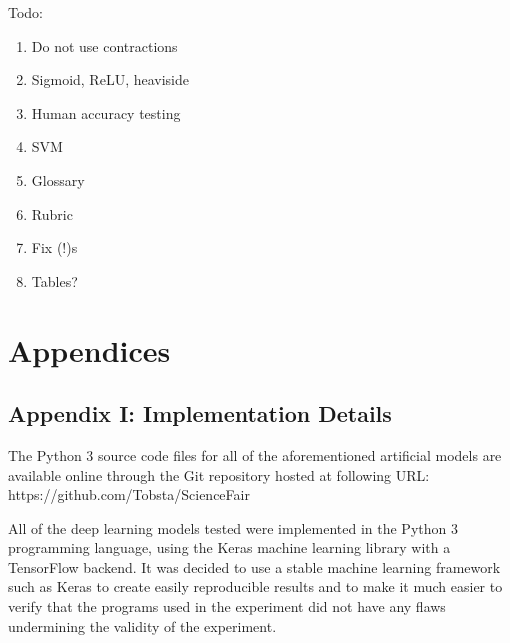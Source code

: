 \documentclass[]{report}
\begin{document}
Todo:

\begin{enumerate}
	\item Do not use contractions
	\item Sigmoid, ReLU, heaviside
	\item Human accuracy testing
	\item SVM
	\item Glossary
	\item Rubric
	\item Fix (!)s
	\item Tables?
\end{enumerate}

\section{Appendices}

\subsection{Appendix I: Implementation Details}

The Python 3 source code files for all of the aforementioned artificial models are available online through the Git repository hosted at following URL: https://github.com/Tobsta/ScienceFair

All of the deep learning models tested were implemented in the Python 3 programming language, using the Keras machine learning library with a TensorFlow backend. It was decided to use a stable machine learning framework such as Keras to create easily reproducible results and to make it much easier to verify that the programs used in the experiment did not have any flaws undermining the validity of the experiment.

\twocolumn
\label{sec:Glossary}
\end{document}
